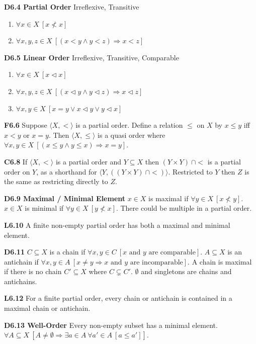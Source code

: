 \documentclass[10pt, landscape]{article}
\begin{document}
\begin{multicols*}{3}
\textbf{D6.4 Partial Order} Irreflexive, Transitive
\begin{enumerate}
    \item $\forall x \in X \ [x \not < x]$
    \item $\forall x, y, z \in X \ [(x < y \land y < z) \Rightarrow x < z]$
\end{enumerate}

\textbf{D6.5 Linear Order} Irreflexive, Transitive, Comparable
\begin{enumerate}
    \item $\forall x \in X \ [x \lhd x]$
    \item $\forall x, y, z \in X \ [(x \lhd y \land y \lhd z) \Rightarrow x \lhd z]$
    \item $\forall x, y \in X \ [x = y \lor x \lhd y \lor y \lhd x]$
\end{enumerate}

\textbf{F6.6} Suppose $\langle X, < \rangle$ is a partial order. Define a relation $\leq$ on $X$ by $x \leq y$ iff $x < y$ or $x = y$. Then $\langle X, \leq \rangle$ is a quasi order where $\forall x, y \in X \ [(x \leq y \land y \leq x) \Rightarrow x = y]$.

\textbf{C6.8} If $\langle X, < \rangle$ is a partial order and $Y \subseteq X$ then $(Y \times Y) \ \cap <$ is a partial order on $Y$, as a shorthand for $\langle Y, ((Y \times Y)\ \cap <)\rangle$. Restricted to $Y$ then $Z$ is the same as restricting directly to $Z$.

\textbf{D6.9 Maximal / Minimal Element} $x \in X$ is maximal if $\forall y \in X \ [x \not < y]$. $x \in X$ is minimal if $\forall y \in X \ [y \not < x]$. There could be multiple in a partial order.

\textbf{L6.10} A finite non-empty partial order has both a maximal and minimal element.

\textbf{D6.11} $C \subseteq X$ is a chain if $\forall x, y \in C \ [x \text{ and } y \text{ are comparable}]$. $A \subseteq X$ is an antichain if $\forall x, y \in A \ [x \neq y \Rightarrow x \text{ and } y \text{ are incomparable}]$. A chain is maximal if there is no chain $C' \subseteq X$ where $C \subsetneq C'$. $\emptyset$ and singletons are chains and antichains.

\textbf{L6.12} For a finite partial order, every chain or antichain is contained in a maximal chain or antichain.

\textbf{D6.13 Well-Order} Every non-empty subset has a minimal element. $\forall A \subseteq X \ [A \neq \emptyset \Rightarrow \exists a \in A \ \forall a' \in A \ [a \leq a']]$.


\end{multicols*}
\end{document}
